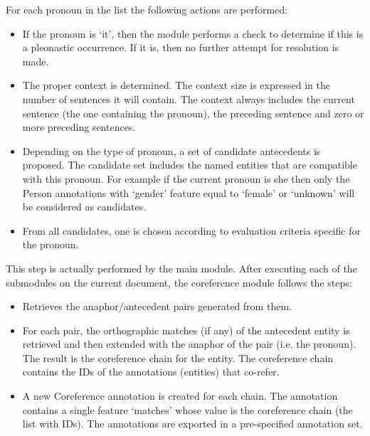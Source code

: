For each pronoun in the list the following actions are performed:
  \begin{itemize}
  \item
  If the pronoun is `it', then the module performs a check to determine if this is a
  pleonastic occurrence.  If it is, then no further attempt for
  resolution is made.

  \item
  The proper context is determined. The context size is expressed in
  the number of sentences it will contain. The context always includes
  the current sentence (the one containing the pronoun), the preceding
  sentence and zero or more preceding sentences.

  \item
  Depending on the type of pronoun, a set of candidate antecedents is
  proposed. The candidate set includes the named entities that are
  compatible with this pronoun. For example if the current pronoun is
  she then only the Person annotations with `gender' feature equal to
  `female' or `unknown' will be considered as candidates.

  \item
  From all candidates, one is chosen according to evaluation criteria
  specific for the pronoun.
  \end{itemize}



This step is actually performed by the
main module. After executing each of the submodules on the current
document, the coreference module follows the steps:

  \begin{itemize}
  \item
  Retrieves the anaphor/antecedent pairs generated from them.

  \item
  For each pair, the orthographic matches (if any) of the antecedent
  entity is retrieved and then extended with the anaphor of the pair
  (i.e. the pronoun). The result is the coreference chain for the
  entity. The coreference chain contains the IDs of the annotations
  (entities) that co-refer.

  \item
  A new Coreference annotation is created for each chain. The
  annotation contains a single feature `matches' whose value is the
  coreference chain (the list with IDs). The annotations are exported
  in a pre-specified annotation set.
  \end{itemize}
%


